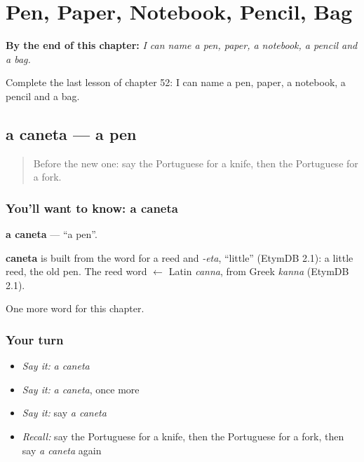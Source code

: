 
\chapter{Pen, Paper, Notebook, Pencil, Bag}
\label{ch:pt-pen-paper-notebook-pencil-bag}

\begin{chapteropening}
\textbf{By the end of this chapter:} \emph{I can name a pen, paper, a notebook, a pencil and a bag.}

Complete the last lesson of chapter 52: I can name a pen, paper, a notebook, a pencil and a bag.
\end{chapteropening}

\section[a caneta]{a caneta — a pen}

\label{lesson:PT-C52-caneta}



\begin{quote}
Before the new one: say the Portuguese for a knife, then the Portuguese for a fork.
\end{quote}

\subsection*{You'll want to know: a caneta}
\textbf{a caneta} — \textquotedblleft{}a pen\textquotedblright{}.

\begin{cousinweb}
\textbf{caneta} is built from the word for a reed and \emph{-eta}, \textquotedblleft{}little\textquotedblright{} (EtymDB 2.1): a little reed, the old pen. The reed word $\leftarrow$ Latin \emph{canna}, from Greek \emph{kanna} (EtymDB 2.1).
\end{cousinweb}

\begin{grammarlens}[title={What you've built}]
One more word for this chapter.
\end{grammarlens}

\subsection*{Your turn}
\begin{itemize}
\raggedright
  \item \emph{Say it:} \emph{a caneta}
  \item \emph{Say it:} \emph{a caneta}, once more
  \item \emph{Say it:} say \emph{a caneta}
  \item \emph{Recall:} say the Portuguese for a knife, then the Portuguese for a fork, then say \emph{a caneta} again
\end{itemize}

